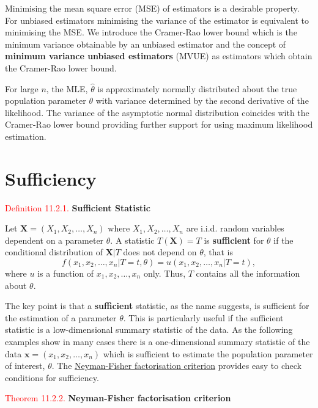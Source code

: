 \documentclass[
]{book}
\begin{document}
Minimising the mean square error (MSE) of estimators is a desirable property. For unbiased estimators minimising the variance of the estimator is equivalent to minimising the MSE. We introduce the Cramer-Rao lower bound which is the minimum variance obtainable by an unbiased estimator and the concept of \textbf{minimum variance unbiased estimators} (MVUE) as estimators which obtain the Cramer-Rao lower bound.

For large \(n\), the MLE, \(\hat{\theta}\) is approximately normally distributed about the true population parameter \(\theta\) with variance determined by the second derivative of the likelihood. The variance of the asymptotic normal distribution coincides with the Cramer-Rao lower bound providing further support for using maximum likelihood estimation.

\hypertarget{MLEprop:sufficient}{%
\section{Sufficiency}\label{MLEprop:sufficient}}

\leavevmode{}%
\textcolor{red}{Definition 11.2.1.}
{\textbf{Sufficient Statistic}}

Let \(\mathbf{X} = (X_1,X_2,\dots,X_n)\) where \(X_1, X_2, \ldots, X_n\) are i.i.d. random variables dependent on a parameter \(\theta\). A statistic \(T(\mathbf{X}) = T\) is \textbf{sufficient} for \(\theta\) if the conditional distribution of \(\mathbf{X}|T\) does not depend on \(\theta\), that is
\[ f(x_1,x_2,\dots,x_n|T=t,\theta) = u(x_1,x_2,\dots,x_n|T=t),\]
where \(u\) is a function of \(x_1,x_2,\dots,x_n\) only. Thus, \(T\) contains all the information about \(\theta\).

The key point is that a \textbf{sufficient} statistic, as the name suggests, is sufficient for the estimation of a parameter \(\theta\). This is particularly useful if the sufficient statistic is a low-dimensional summary statistic of the data. As the following examples show in many cases there is a one-dimensional summary statistic of the data \(\mathbf{x} = (x_1,x_2,\ldots,x_n)\) which is sufficient to estimate the population parameter of interest, \(\theta\). The \protect\hyperlink{MLEprop:thm:Neyman-Fisher}{Neyman-Fisher factorisation criterion} provides easy to check conditions for sufficiency.

\leavevmode{}%
\textcolor{red}{Theorem 11.2.2.}
{\textbf{Neyman-Fisher factorisation criterion}}
\end{document}
